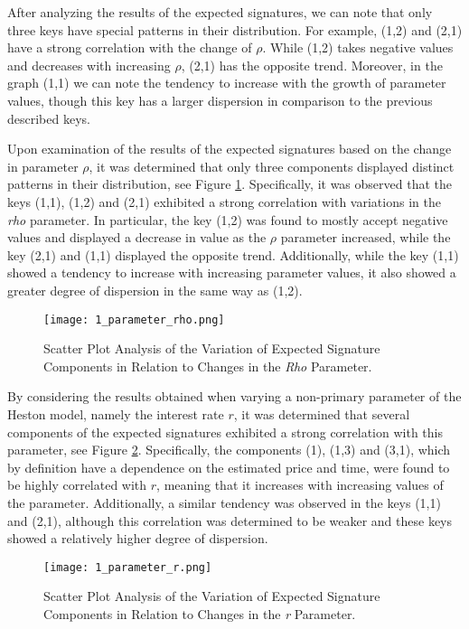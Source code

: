 \documentclass[12pt,a4paper]{report}
\theoremstyle{definition}
\begin{document}
After analyzing the results of the expected signatures, we can note that only three keys have special patterns in their distribution. For example, (1,2) and (2,1) have a strong correlation with the change of $\rho$. While (1,2) takes negative values and decreases with increasing $\rho$, (2,1) has the opposite trend. Moreover, in the graph (1,1) we can note the tendency to increase with the growth of parameter values, though this key has a larger dispersion in comparison to the previous described keys.

Upon examination of the results of the expected signatures based on the change in parameter $\rho$, it was determined that only three components displayed distinct patterns in their distribution, see Figure \ref{1_parameter_rho}. Specifically, it was observed that the keys (1,1), (1,2) and (2,1) exhibited a strong correlation with variations in the \textit{rho} parameter. In particular, the key (1,2) was found to mostly accept negative values and displayed a decrease in value as the $\rho$ parameter increased, while the key (2,1) and (1,1) displayed the opposite trend. Additionally, while the key (1,1) showed a tendency to increase with increasing parameter values, it also showed a greater degree of dispersion in the same way as (1,2).

\begin{figure}[!htbp]
	\centering
	\texttt{[image: 1\_parameter\_rho.png]}
	\caption{Scatter Plot Analysis of the Variation of Expected Signature Components in Relation to Changes in the \textit{Rho} Parameter.}
	\label{1_parameter_rho}
\end{figure}


By considering the results obtained when varying a non-primary parameter of the Heston model, namely the interest rate $r$, it was determined that several components of the expected signatures exhibited a strong correlation with this parameter, see Figure \ref{1_parameter_r}. Specifically, the components (1), (1,3) and (3,1), which by definition have a dependence on the estimated price and time, were found to be highly correlated with $r$, meaning that it increases with increasing values of the parameter. Additionally, a similar tendency was observed in the keys (1,1) and (2,1), although this correlation was determined to be weaker and these keys showed a relatively higher degree of dispersion.

\begin{figure}[!htbp]
	\centering
	\texttt{[image: 1\_parameter\_r.png]}
	\caption{Scatter Plot Analysis of the Variation of Expected Signature Components in Relation to Changes in the \textit{r} Parameter.}
	\label{1_parameter_r}
\end{figure}
\end{document}
